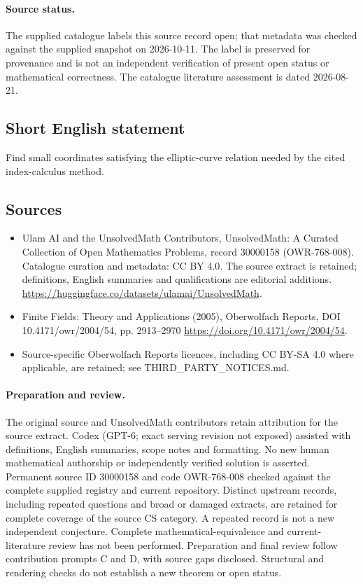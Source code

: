 \documentclass[11pt]{article}
\begin{document}
\paragraph{Source status.}
The supplied catalogue labels this source record open; that metadata was checked against the supplied snapshot on 2026-10-11. The label is preserved for provenance and is not an independent verification of present open status or mathematical correctness. The catalogue literature assessment is dated 2026-08-21.
\subsection{Short English statement}
Find small coordinates satisfying the elliptic-curve relation needed by the cited index-calculus method.
\subsection{Sources}
\begin{itemize}
\item[S1] Ulam AI and the UnsolvedMath Contributors, UnsolvedMath: A Curated Collection of Open Mathematics Problems, record 30000158 (OWR-768-008). Catalogue curation and metadata: CC BY 4.0. The source extract is retained; definitions, English summaries and qualifications are editorial additions.
\url{https://huggingface.co/datasets/ulamai/UnsolvedMath}.
\item[S2] Finite Fields: Theory and Applications (2005), Oberwolfach Reports, DOI 10.4171/owr/2004/54, pp. 2913--2970
\url{https://doi.org/10.4171/owr/2004/54}.
\item Source-specific Oberwolfach Reports licences, including CC BY-SA 4.0 where applicable, are retained; see THIRD\_PARTY\_NOTICES.md.
\end{itemize}
\paragraph{Preparation and review.}
The original source and UnsolvedMath contributors retain attribution for the source extract. Codex (GPT-6; exact serving revision not exposed) assisted with definitions, English summaries, scope notes and formatting. No new human mathematical authorship or independently verified solution is asserted. Permanent source ID 30000158 and code OWR-768-008 checked against the complete supplied registry and current repository. Distinct upstream records, including repeated questions and broad or damaged extracts, are retained for complete coverage of the source CS category. A repeated record is not a new independent conjecture. Complete mathematical-equivalence and current-literature review has not been performed. Preparation and final review follow contribution prompts C and D, with source gaps disclosed. Structural and rendering checks do not establish a new theorem or open status.
\label{end:30000158}
\end{document}
